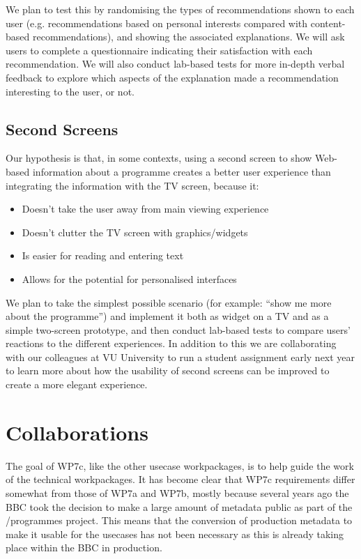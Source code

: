 \documentclass{notube}
\begin{document}
We plan to test this by randomising the types of recommendations shown to each user (e.g. recommendations based on personal interests compared with content-based recommendations), and showing the associated explanations. We will ask users to complete a questionnaire indicating their satisfaction with each recommendation. We will also conduct lab-based tests for more in-depth verbal feedback to explore which aspects of the explanation made a recommendation interesting to the user, or not.

\section{Second Screens}

Our hypothesis is that, in some contexts, using a second screen to show Web-based information about a programme creates a better user experience than integrating the information with the TV screen, because it:

\begin{itemize}
\item{Doesn't take the user away from main viewing experience}  \item{Doesn't clutter the TV screen with graphics/widgets} \item{Is easier for reading and entering text} \item{Allows for the potential for personalised interfaces}
\end{itemize}

We plan to take the simplest possible scenario (for example: ``show me more about the programme'') and implement it both as widget on a TV and as a simple two-screen prototype, and then conduct lab-based tests to compare users' reactions to the different experiences. In addition to this we are collaborating with our colleagues at VU University to run a student assignment early next year to learn more about how the usability of second screens can be improved to create a more elegant experience.

\chapter{Collaborations}

The goal of WP7c, like the other usecase workpackages, is to help guide the work of the technical workpackages. It has become clear that WP7c requirements differ somewhat from those of WP7a and WP7b, mostly because several years ago the BBC took the decision to make a large amount of metadata public as part of the /programmes project. This means that the conversion of production metadata to make it usable for the usecases has not been necessary as this is already taking place within the BBC in production.
\end{document}
